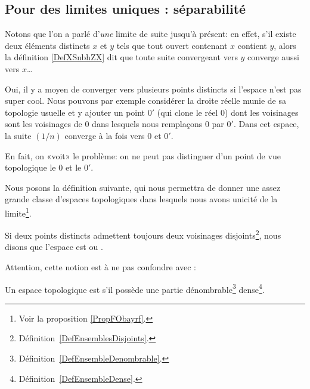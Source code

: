 \subsection{Pour des limites uniques : séparabilité}

Notons que l'on a parlé d'\emph{une} limite de suite jusqu'à présent: en effet, s'il existe deux éléments distincts $x$ et $y$ tels que tout ouvert contenant $x$ contient $y$, alors la définition \ref{DefXSnbhZX} dit que toute suite convergeant vers $y$ converge aussi vers $x$\dots


\begin{example} \label{EXooSHKAooZQEVLB}
    Oui, il y a moyen de converger vers plusieurs points distincts si l'espace n'est pas super cool. Nous pouvons par exemple \cite{EJVQuas} considérer la droite réelle munie de sa topologie usuelle et y ajouter un point $0'$ (qui clone le réel $0$) dont les voisinages sont les voisinages de $0$ dans lesquels nous remplaçons $0$ par $0'$. Dans cet espace, la suite $(1/n)$ converge à la fois vers $0$ et $0'$.

    En fait, on «voit» le problème: on ne peut pas distinguer d'un point de vue topologique le $0$ et le $0'$.
\end{example}

Nous posons la définition suivante, qui nous permettra de donner une assez grande classe d'espaces topologiques dans lesquels nous avons unicité de la limite\footnote{Voir la proposition \ref{PropFObayrf}.}.
\begin{definition}  \label{DefYFmfjjm}\label{DefWEOTrVl}
    Si deux points distincts admettent toujours deux voisinages disjoints\footnote{Définition~\ref{DefEnsemblesDisjoints}.}, nous disons que l'espace est  ou .
\end{definition}

Attention, cette notion est à ne pas confondre avec :
\begin{definition}  \label{DefUADooqilFK}
    Un espace topologique est  s'il possède une partie dénombrable\footnote{Définition~\ref{DefEnsembleDenombrable}.} dense\footnote{Définition~\ref{DefEnsembleDense}.}.
\end{definition}

